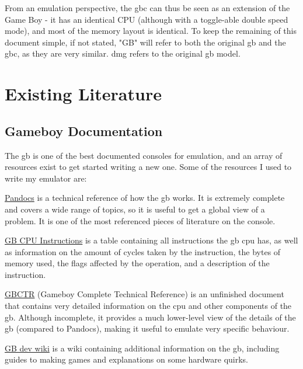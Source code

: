 \documentclass[11pt]{report}
\begin{document}
From an emulation perspective, the \glsdesc{gbc} can thus be seen as an extension of the Game Boy - it has an identical CPU (although with a toggle-able double speed mode), and most of the memory layout is identical. To keep the remaining of this document simple, if not stated, "GB" will refer to both the original \glsdesc{gb} and the \glsdesc{gbc}, as they are very similar. \gls{dmg} refers to the original \glsdesc{gb} model.

\section{Existing Literature}

\subsection{Gameboy Documentation}

The \glsdesc{gb} is one of the best documented consoles for emulation, and an array of resources exist to get started writing a new one. Some of the resources I used to write my emulator are:

\begin{compactitem}
    \item \href{https://gbdev.io/pandocs/}{Pandocs} is a technical reference of how the \gls{gb} works. It is extremely complete and covers a wide range of topics, so it is useful to get a global view of a problem. It is one of the most referenced pieces of literature on the console.
    \item \href{https://meganesu.github.io/generate-gb-opcodes/}{GB CPU Instructions} is a table containing all instructions the \gls{gb} \gls{cpu} has, as well as information on the amount of cycles taken by the instruction, the bytes of memory used, the flags affected by the operation, and a description of the instruction.
    \item \href{https://gekkio.fi/files/gb-docs/gbctr.pdf}{GBCTR} (Gameboy Complete Technical Reference) is an unfinished document that contains very detailed information on the \gls{cpu} and other components of the \gls{gb}. Although incomplete, it provides a much lower-level view of the details of the \gls{gb} (compared to Pandocs), making it useful to emulate very specific behaviour.
    \item \href{https://gbdev.gg8.se/wiki/}{GB dev wiki} is a wiki containing additional information on the \gls{gb}, including guides to making games and explanations on some hardware quirks.
\end{compactitem}
\end{document}
